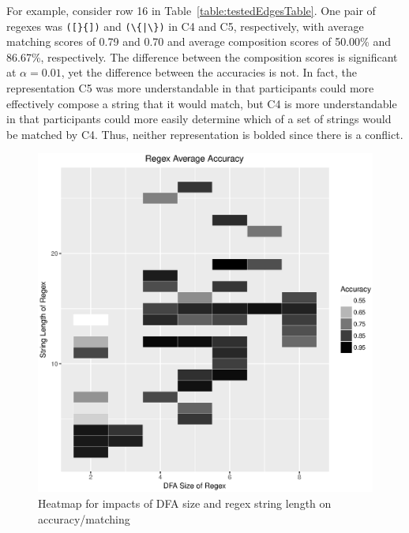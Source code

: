 For example, consider row 16 in Table~\ref{table:testedEdgesTable}.
One pair of regexes was \verb!([}{])! and \verb!(\{|\})! in C4 and C5, respectively, with average matching scores of 0.79  and 0.70 and average composition scores of 50.00\%  and 86.67\%, respectively.
The difference between the composition scores is significant at $\alpha = 0.01$, yet the difference between the accuracies is not. 
In fact, the representation C5 was more understandable in that participants could more effectively compose a string that it would match, but C4 is more understandable in that participants could more easily determine which of a set of strings would be matched by C4. Thus, neither representation is bolded since there is a conflict. 



\begin{figure}[tb]
\centering
\includegraphics[width=0.75\columnwidth]{graphs/heatmap_avgAccur.eps}
\vspace{-12pt}
\caption{Heatmap for impacts of DFA size and regex string length on accuracy/matching}
\vspace{-6pt}
\label{fig:heatmap}
\end{figure}

